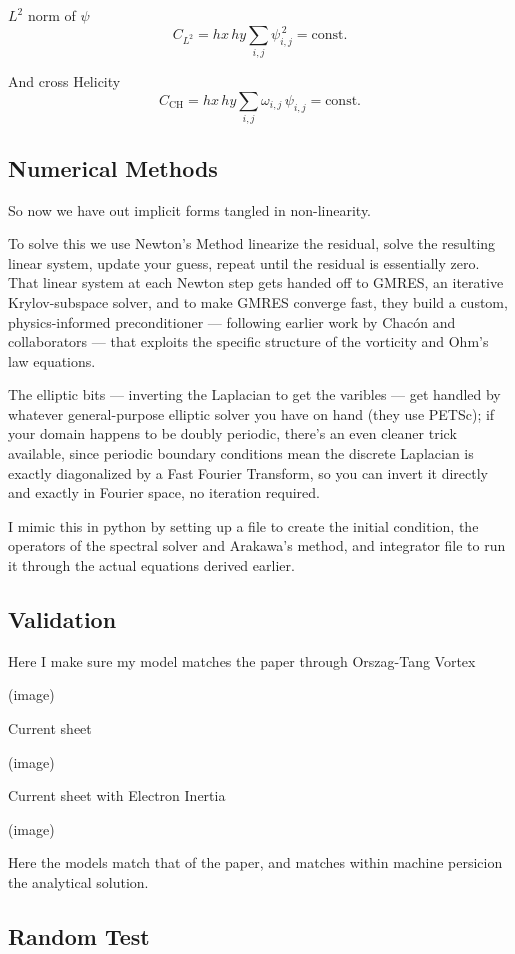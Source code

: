 $L^2$ norm of $\psi$
\[
	C_{L^2}
	= hx\,hy \sum_{i,j} \psi_{i,j}^{\,2}
	= \text{const.}
\]

And cross Helicity
\[
	C_{\mathrm{CH}}
	= hx\,hy \sum_{i,j} \omega_{i,j}\,\psi_{i,j}
	= \text{const.}
\]

\subsection{Numerical Methods}

So now we have out implicit forms tangled in non-linearity.

To solve this we use Newton's Method linearize the residual, solve the resulting linear system, update your guess, repeat until the residual is essentially zero. That linear system at each Newton step gets handed off to GMRES, an iterative Krylov-subspace solver, and to make GMRES converge fast, they build a custom, physics-informed preconditioner — following earlier work by Chacón and collaborators — that exploits the specific structure of the vorticity and Ohm's law equations.

The elliptic bits — inverting the Laplacian to get the varibles — get handled by whatever general-purpose elliptic solver you have on hand (they use PETSc); if your domain happens to be doubly periodic, there's an even cleaner trick available, since periodic boundary conditions mean the discrete Laplacian is exactly diagonalized by a Fast Fourier Transform, so you can invert it directly and exactly in Fourier space, no iteration required.


I mimic this in python by setting up a file to create the initial condition, the operators of the spectral solver and Arakawa's method, and integrator file to run it through the actual equations derived earlier.

\subsection{Validation}%
%
Here I make sure my model matches the paper through Orszag-Tang Vortex

(image)

Current sheet

(image)

Current sheet with Electron Inertia

(image)

Here the models match that of the paper, and matches within machine persicion the analytical solution.

\subsection{Random Test}

